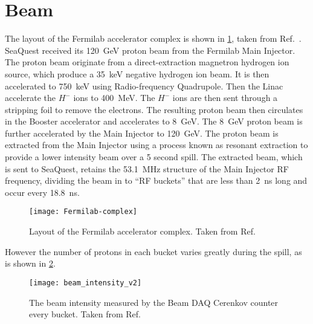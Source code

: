 \documentclass[../main.tex]{subfiles}
\begin{document}
\section{Beam}
The layout of the Fermilab accelerator complex is shown in \cref{fig:complex}, taken from Ref.~\cite{concept-book}.
SeaQuest received its \SI{120}{\GeV} proton beam from the Fermilab Main Injector.
The proton beam originate from a direct-extraction magnetron hydrogen ion source,
which produce a \SI{35}{\keV} negative hydrogen ion beam. It is then accelerated
to \SI{750}{\keV} using Radio-frequency Quadrupole. Then the Linac accelerate the
$H^-$ ions to \SI{400}{\MeV}. The $H^-$ ions are then sent through a stripping foil
to remove the electrons. The resulting proton beam then circulates in the Booster
accelerator and accelerates to \SI{8}{\GeV}. The \SI{8}{\GeV} proton beam is
further accelerated by the Main Injector to \SI{120}{\GeV}. The proton beam is
extracted from the Main Injector using a process known as resonant extraction to
provide a lower intensity beam over a 5 second spill. The extracted beam, which
is sent to SeaQuest, retains the \SI{53.1}{\MHz} structure of the Main
Injector RF frequency, dividing the beam in to ``RF buckets'' that are less than
\SI{2}{\ns} long and occur every \SI{18.8}{\ns}.
\begin{figure}[htbp!]
	\centering
	\texttt{[image: Fermilab-complex]}
	\caption{Layout of the Fermilab accelerator complex. Taken from Ref.~\cite{concept-book}}
	\label{fig:complex}
\end{figure}
However the number of protons in each bucket varies greatly during the spill, as
is shown in \cref{fig:intensity}.
\begin{figure}[htpb!]
	\centering
	\texttt{[image: beam\_intensity\_v2]}
	\caption{The beam intensity measured by the Beam DAQ Cerenkov counter every
		bucket. Taken from Ref.~\cite{aidala2019}}
	\label{fig:intensity}
\end{figure}
\end{document}
